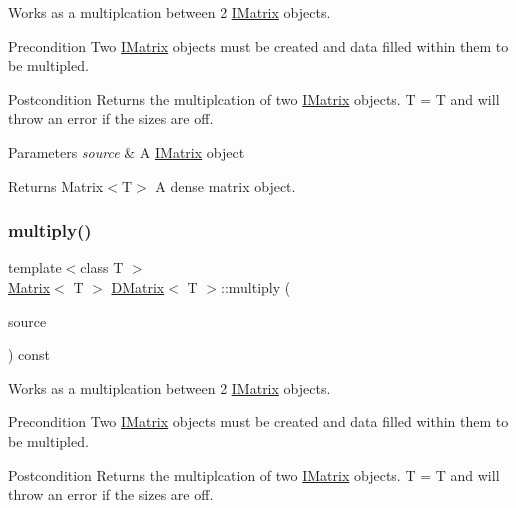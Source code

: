 Works as a multiplcation between 2 \mbox{\hyperlink{class_i_matrix}{I\+Matrix}} objects. 

\begin{DoxyPrecond}{Precondition}
Two \mbox{\hyperlink{class_i_matrix}{I\+Matrix}} objects must be created and data filled within them to be multipled. 
\end{DoxyPrecond}
\begin{DoxyPostcond}{Postcondition}
Returns the multiplcation of two \mbox{\hyperlink{class_i_matrix}{I\+Matrix}} objects. T = T and will throw an error if the sizes are off.
\end{DoxyPostcond}

\begin{DoxyParams}{Parameters}
{\em source} & A \mbox{\hyperlink{class_i_matrix}{I\+Matrix}} object \\
\hline
\end{DoxyParams}
\begin{DoxyReturn}{Returns}
Matrix$<$\+T$>$ A dense matrix object. 
\end{DoxyReturn}
\mbox{\label{class_d_matrix_aef4468dd3919416a12fbde911b653a8e}} 
\subsubsection{\texorpdfstring{multiply()}{multiply()}\hspace{0.1cm}{\footnotesize\ttfamily [6/6]}}
{\footnotesize\ttfamily template$<$class T $>$ \\
\mbox{\hyperlink{class_matrix}{Matrix}}$<$ T $>$ \mbox{\hyperlink{class_d_matrix}{D\+Matrix}}$<$ T $>$\+::multiply (\begin{DoxyParamCaption}\item[{const \mbox{\hyperlink{class_i_matrix}{I\+Matrix}}$<$ \mbox{\hyperlink{class_d_matrix}{D\+Matrix}}$<$ T $>$, T $>$ \&}]{source }\end{DoxyParamCaption}) const\hspace{0.3cm}{\ttfamily [virtual]}}



Works as a multiplcation between 2 \mbox{\hyperlink{class_i_matrix}{I\+Matrix}} objects. 

\begin{DoxyPrecond}{Precondition}
Two \mbox{\hyperlink{class_i_matrix}{I\+Matrix}} objects must be created and data filled within them to be multipled. 
\end{DoxyPrecond}
\begin{DoxyPostcond}{Postcondition}
Returns the multiplcation of two \mbox{\hyperlink{class_i_matrix}{I\+Matrix}} objects. T = T and will throw an error if the sizes are off.
\end{DoxyPostcond}

